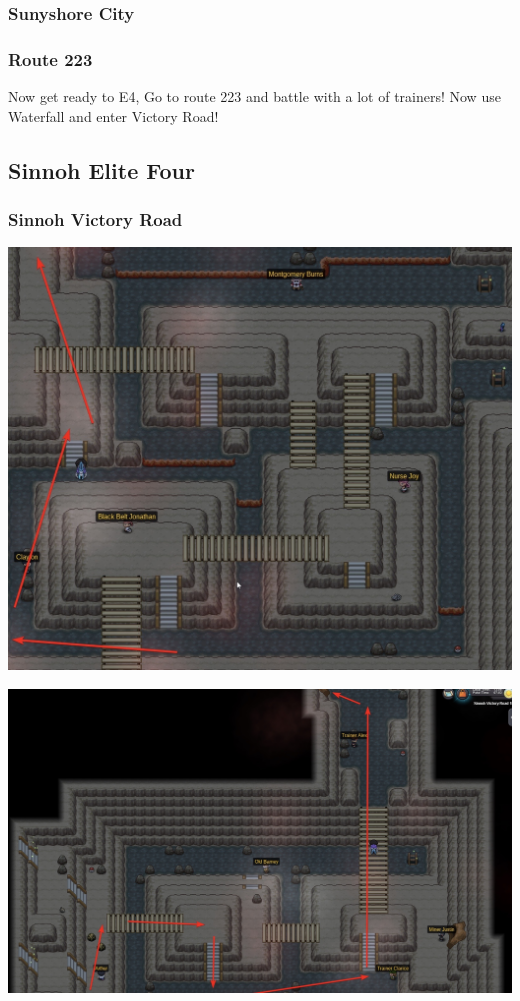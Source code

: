 \documentclass[11pt]{article}
\begin{document}
\subsubsection{Sunyshore City}\label{subsubsec:sunyshore-city}

\subsubsection{Route 223}\label{subsubsec:route-223}
Now get ready to E4, Go to route 223 and battle with a lot of trainers!
Now use Waterfall and enter Victory Road!




\subsection{Sinnoh Elite Four}\label{subsec:sinnoh-elite-four}

\subsubsection{Sinnoh Victory Road}\label{subsubsec:sinnoh-victory-road}

\includegraphics[width=\textwidth]{walkthrough/Sinnoh/victory-road-1}

\includegraphics[width=\textwidth]{walkthrough/Sinnoh/victory-road-2}
\end{document}

